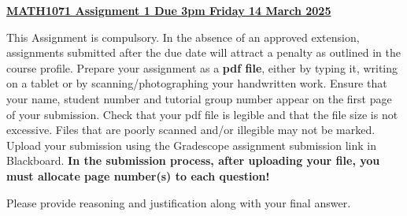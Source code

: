 \documentclass[12pt]{article}
\begin{document}
{\underline{\bf MATH1071 \hspace*{3.8cm} Assignment 1 
\hspace*{2cm} Due 3pm Friday 14 March 2025}}

\vspace*{3mm}

This Assignment is compulsory. In the absence of an approved extension, assignments submitted after the due date will attract a penalty as outlined in the course profile. Prepare your assignment as a {\bf pdf file}, either by typing it, writing on a tablet or by scanning/photographing your handwritten work. Ensure that your name, student number and tutorial group number appear on the first page of your submission. Check that your pdf file is legible and that the file size is not excessive. Files that are poorly scanned and/or illegible may not be marked. Upload your submission using the Gradescope assignment submission link in Blackboard. {\bf In the submission process, after uploading your file, you must allocate page number(s) to each question!}

Please provide reasoning and justification along with your final answer. 
  
\vskip 0.2cm
\end{document}
